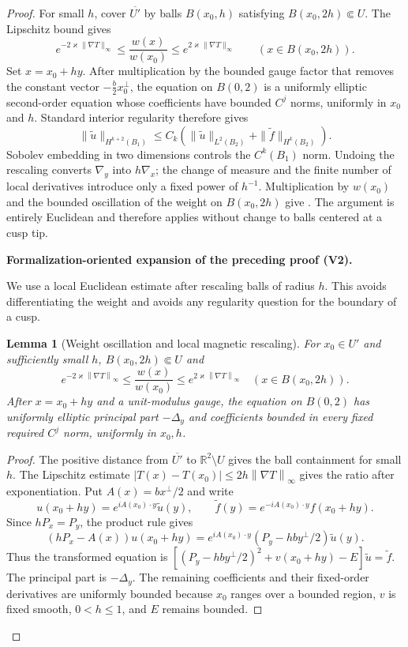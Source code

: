 \documentclass[11pt]{article}
\newtheorem{lemma}[theorem]{Lemma}
\newcommand{\formalisationparentid}{X}
\newenvironment{formalisationaddition}[1]{\par\medskip\begingroup\color{blue}\def\formalisationparentid{#1}\setcounter{formalizationsublemma}{0}\let\lemma\formalizationsublemma\let\endlemma\endformalizationsublemma
  \def\Eo{\mathcal E_h^\circ}\def\EE{\mathcal E_h}\def\phio{\phi_h^\circ}\def\phih{\phi_h}\def\Ho{H_h^{\rm atom}(v^\circ)}\def\Ha{H_h^{\rm atom}}\def\HL{H_h^{L}}\def\Dh{D_h}\def\Log{\operatorname{Log}}\def\ellh{\ell_h}\def\Gp{G_{p,h}}\def\Ast{A_{*,h}}\def\ahat{\widehat{\mathfrak a}_h}\def\ah{\mathfrak a_h}\def\rh{\widehat\rho_h}\def\deltah{\widehat\delta_h}\def\oldref##1{\textup{(##1)}}\def\interface##1{\par\noindent\textit{Analytical interface used here.} ##1\par}\def\finish{\par\noindent\textit{Conclusion of the formalization-oriented expansion.} }\par\noindent\textbf{Formalization-oriented expansion of the preceding proof (V2).}\par\smallskip
}{\par\endgroup\medskip
}
\newcommand{\R}{\mathbb R}
\newcommand{\norm}[1]{\left\|#1\right\|}
\begin{document}
\begin{proof}
For small $h$, cover $\overline{U'}$ by balls $B(x_0,h)$ satisfying
$B(x_0,2h)\Subset U$.  The Lipschitz bound gives
\[
 e^{-2\varkappa\|\nabla T\|_\infty}
 \le \frac{w(x)}{w(x_0)}
 \le e^{2\varkappa\|\nabla T\|_\infty}
 \qquad(x\in B(x_0,2h)).
\]
Set $x=x_0+hy$.  After multiplication by the bounded gauge factor that
removes the constant vector $-\frac b2x_0^\perp$, the equation on
$B(0,2)$ is a uniformly elliptic second-order equation whose coefficients
have bounded $C^j$ norms, uniformly in $x_0$ and $h$.  Standard interior
regularity therefore gives
\[
 \|\widetilde u\|_{H^{k+2}(B_1)}
 \le C_k\left(
   \|\widetilde u\|_{L^2(B_2)}
   +\|\widetilde f\|_{H^k(B_2)}
 \right).
\]
Sobolev embedding in two dimensions controls the $C^k(B_1)$ norm.  Undoing
the rescaling converts $\nabla_y$ into $h\nabla_x$; the change of measure
and the finite number of local derivatives introduce only a fixed power of
$h^{-1}$.  Multiplication by $w(x_0)$ and the bounded oscillation of the
weight on $B(x_0,2h)$ give .  The argument is
entirely Euclidean and therefore applies without change to balls centered at
a cusp tip.

\begin{formalisationaddition}{LA.3}
We use a local Euclidean estimate after rescaling balls of radius $h$. This avoids differentiating the weight and avoids any regularity question for the boundary of a cusp.

\begin{lemma}[Weight oscillation and local magnetic rescaling]\label{sublemma:LA-3-rescaling}
For $x_0\in U'$ and sufficiently small $h$, $B(x_0,2h)\Subset U$ and
\[
 e^{-2\varkappa\norm{\nabla T}_\infty}
 \le\frac{w(x)}{w(x_0)}
 \le e^{2\varkappa\norm{\nabla T}_\infty}
 \quad (x\in B(x_0,2h)).
\]
After $x=x_0+hy$ and a unit-modulus gauge, the equation on $B(0,2)$ has uniformly elliptic principal part $-\Delta_y$ and coefficients bounded in every fixed required $C^j$ norm, uniformly in $x_0,h$.
\end{lemma}
\begin{proof}
The positive distance from $\overline{U'}$ to $\R^2\setminus U$ gives the ball containment for small $h$. The Lipschitz estimate $|T(x)-T(x_0)|\le2h\norm{\nabla T}_\infty$ gives the ratio after exponentiation. Put $A(x)=bx^\perp/2$ and write
\[
 u(x_0+hy)=e^{iA(x_0)\cdot y}\widetilde u(y),
 \qquad \widetilde f(y)=e^{-iA(x_0)\cdot y}f(x_0+hy).
\]
Since $hP_x=P_y$, the product rule gives
\[
 (hP_x-A(x))u(x_0+hy)
 =e^{iA(x_0)\cdot y}(P_y-hby^\perp/2)\widetilde u(y).
\]
Thus the transformed equation is
$[(P_y-hby^\perp/2)^2+v(x_0+hy)-E]\widetilde u=\widetilde f$.
The principal part is $-\Delta_y$. The remaining coefficients and their fixed-order derivatives are uniformly bounded because $x_0$ ranges over a bounded region, $v$ is fixed smooth, $0<h\le1$, and $E$ remains bounded.
\end{proof}


\end{formalisationaddition}
\end{proof}
\end{document}
